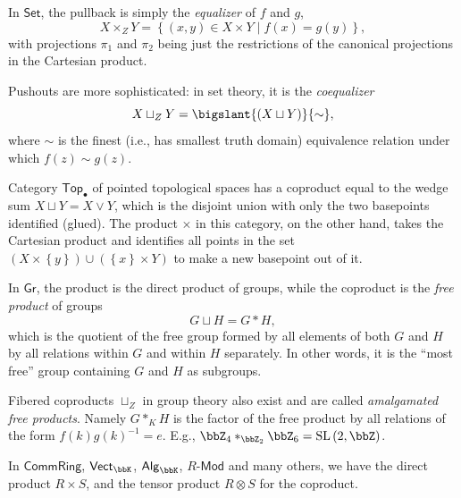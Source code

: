 %
\begin{example}\label{pullbacks in Set}
    In $\mathsf{Set}$, the pullback is simply the \emph{equalizer}
    of $f$ and $g$, 
    \[
    X\times_{Z}Y=\left\{ \left(x,y\right)\in X\times Y\mid f(x)=g(y)\right\} ,
    \]
    with projections $\pi_{1}$ and $\pi_{2}$ being just the restrictions
    of the canonical projections in the Cartesian product.

    Pushouts are more sophisticated: in set theory, it is the \emph{coequalizer}
    \[
    X\sqcup_{Z}Y=\bigslant{\left(X\sqcup Y\right)}{\sim},
    \]
    where $\sim$ is the finest (i.e., has smallest truth domain) equivalence
    relation under which $f(z)\sim g(z)$.
\end{example}
%
\begin{example}
    Category $\mathsf{Top}_{\bullet}$ of pointed topological spaces has
    a coproduct equal to the wedge sum $X\sqcup Y=X\vee Y$, which is
    the disjoint union with only the two basepoints identified (glued).
    The product $\times$ in this category, on the other hand, takes the
    Cartesian product and identifies all points in the set $\left(X\times\left\{ y\right\} \right)\cup\left(\left\{ x\right\} \times Y\right)$
    to make a new basepoint out of it.
\end{example}
%
\begin{example}\label{pushouts in groups}
    In $\mathsf{Gr}$, the product is the direct product of groups, while
    the coproduct is the \emph{free product} of groups 
    \[
    G\sqcup H=G\ast H,
    \]
    which is the quotient of the free group formed by all elements of
    both $G$ and $H$ by all relations within $G$ and within $H$ separately.
    In other words, it is the ``most free'' group containing $G$ and
    $H$ as subgroups. 

    Fibered coproducts $\sqcup_{Z}$ in group theory also exist and are
    called \emph{amalgamated free products}. Namely $G\ast_K H$ is the factor of the free product by all relations of the form $f(k)g(k)^{-1}=e$. E.g., $\bbZ_{4}\ast_{\bbZ_{2}}\bbZ_{6}=\mathrm{SL}\left(2,\bbZ\right)$.
\end{example}
%
\begin{example}
    In $\mathsf{CommRing}$, $\mathsf{Vect}_{\bbK}$, $\mathsf{Alg}_{\bbK}$,
    $R\text{-}\mathsf{Mod}$ and many others, we have the direct product
    $R\times S$, and the tensor product $R\otimes S$ for the coproduct.
\end{example}

